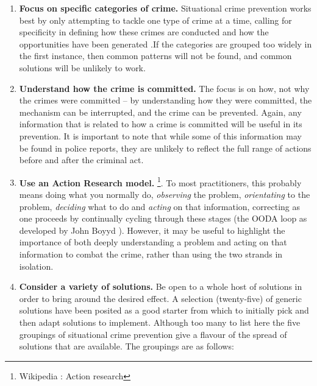 \begin{enumerate}

\item{\bf{Focus on specific categories of crime.}} Situational crime prevention works best by only attempting to tackle one type of crime at a time, calling for specificity in defining how these crimes are conducted and how the opportunities have been generated \parencite{felson1998opportunity}.If the categories are grouped too widely in the first instance, then common patterns will not be found, and common solutions will be unlikely to work.

\item{\bf{Understand how the crime is committed.}} The focus is on how, not why the crimes were committed – by understanding how they were committed, the mechanism can be interrupted, and the crime can be prevented. Again, any information that is related to how a crime is committed will be useful in its prevention. It is important to note that while some of this information may be found in police reports, they are unlikely to reflect the full range of actions before and after the criminal act.

\item{\bf{Use an Action Research model.}}  \footnote{Wikipedia : Action research}. To most practitioners, this probably means doing what you normally do, \emph{observing} the problem, \emph{orientating} to the problem, \emph{deciding} what to do and \emph{acting} on that information, correcting as one proceeds by continually cycling through these stages (the OODA loop as developed by John Boyyd \parencite{modernstrat}). However, it may be useful to highlight the importance of both deeply understanding a problem and acting on that information to combat the crime, rather than using the two strands in isolation.

\item{\bf{Consider a variety of solutions.}} Be open to a whole host of solutions in order to bring around the desired effect. A selection (twenty-five) of generic solutions have been posited as a good starter from which to initially pick and then adapt solutions to implement. Although too many to list here the five groupings of situational crime prevention give a flavour of the spread of solutions that are available. The groupings are as follows:


\end{enumerate}
